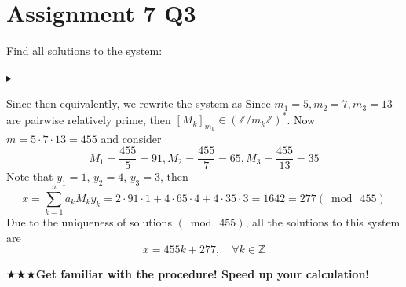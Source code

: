 \section*{Assignment 7 Q3}
Find all solutions to the system:

$\blacktriangleright$

Since
then equivalently, we rewrite the system as
Since $m_1=5, m_2=7, m_3=13$ are pairwise relatively prime, then $[M_k]_{m_k}\in(\mathbb{Z}/m_k\mathbb{Z})^*$. Now $m=5\cdot7\cdot13=455$ and consider $$M_1=\frac{455}{5}=91,M_2=\frac{455}{7}=65,M_3=\frac{455}{13}=35$$
Note that $y_1=1$, $y_2=4$, $y_3=3$, then $$x=\sum_{k=1}^na_kM_ky_k=2\cdot91\cdot1+4\cdot65\cdot4+4\cdot35\cdot3=1642=277(\bmod\ 455)$$
Due to the uniqueness of solutions $(\bmod\ 455)$, all the solutions to this system are $$x=455k+277,\quad\forall k\in\mathbb{Z}$$

$\bigstar\bigstar\bigstar$\textbf{Get familiar with the procedure! Speed up your calculation!}

